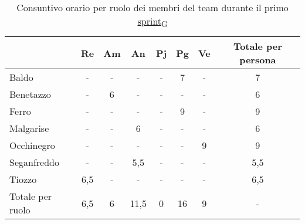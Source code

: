 \begin{table}[!h]
	\centering
	\begin{tabular}{ | l | c | c | c | c | c | c | c | }
		\hline
		\textbf{}        & \textbf{Re} & \textbf{Am} & \textbf{An} & \textbf{Pj} & \textbf{Pg} & \textbf{Ve} & \textbf{Totale per persona} \\
		\hline
		Baldo            & -           & -           & -           & -           & 7           & -           & 7                           \\
		Benetazzo        & -           & 6           & -           & -           & -           & -           & 6                           \\
		Ferro            & -           & -           & -           & -           & 9           & -           & 9                           \\
		Malgarise        & -           & -           & 6           & -           & -           & -           & 6                           \\
		Occhinegro       & -           & -           & -           & -           & -           & 9           & 9                           \\
		Seganfreddo      & -           & -           & 5,5         & -           & -           & -           & 5,5                         \\
		Tiozzo           & 6,5         & -           & -           & -           & -           & -           & 6,5                         \\
		\hline
		Totale per ruolo & 6,5         & 6           & 11,5        & 0           & 16          & 9           & -                           \\
		\hline
	\end{tabular}
	\caption{Consuntivo orario per ruolo dei membri del team durante il primo \href{https://7last.github.io/docs/pb/documentazione-interna/glossario\#sprint}{sprint\textsubscript{G}}}
	
\end{table}

